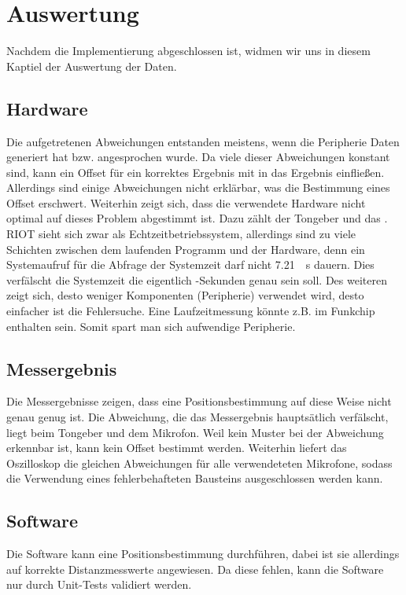 \newpage
\section{Auswertung}

Nachdem die Implementierung abgeschlossen ist, widmen wir uns in diesem Kaptiel der Auswertung der Daten.

\subsection{Hardware}
Die aufgetretenen Abweichungen entstanden meistens, wenn die Peripherie Daten generiert hat bzw. angesprochen wurde. Da viele dieser Abweichungen konstant sind, kann ein Offset für ein korrektes Ergebnis mit in das Ergebnis einfließen. Allerdings sind einige Abweichungen nicht erklärbar, was die Bestimmung eines Offset erschwert. Weiterhin zeigt sich, dass die verwendete Hardware nicht optimal auf dieses Problem abgestimmt ist. Dazu zählt der Tongeber und das  \microphone . RIOT sieht sich zwar als Echtzeitbetriebssystem, allerdings sind zu viele Schichten zwischen dem laufenden Programm und der Hardware, denn ein Systemaufruf für die Abfrage der Systemzeit darf nicht \SI{7,21}{\mu s} dauern. Dies verfälscht die Systemzeit die eigentlich \si{\mu}-Sekunden genau sein soll. Des weiteren zeigt sich, desto weniger Komponenten (Peripherie) verwendet wird, desto einfacher ist die Fehlersuche. Eine Laufzeitmessung könnte z.B. im Funkchip enthalten sein. Somit spart man sich aufwendige Peripherie. 

\subsection{Messergebnis}
Die Messergebnisse zeigen, dass eine Positionsbestimmung auf diese Weise nicht genau genug ist. Die Abweichung, die das Messergebnis hauptsätlich verfälscht, liegt beim Tongeber und dem Mikrofon. Weil kein Muster bei der Abweichung erkennbar ist, kann kein Offset bestimmt werden. Weiterhin liefert das Oszilloskop die gleichen Abweichungen für alle verwendeteten Mikrofone, sodass die Verwendung eines fehlerbehafteten Bausteins ausgeschlossen werden kann. 

\subsection{Software}

Die Software kann eine Positionsbestimmung durchführen, dabei ist sie allerdings auf korrekte Distanzmesswerte angewiesen. Da diese fehlen, kann die Software nur durch Unit-Tests validiert werden.





